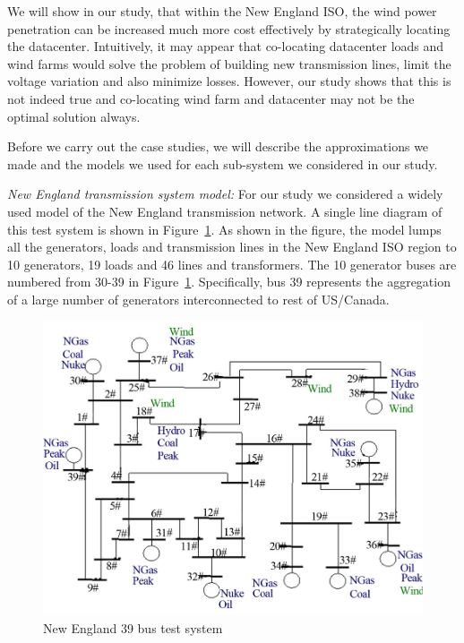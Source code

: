 We will show in our study, that within the New England ISO, the wind power penetration can be increased much more cost effectively by strategically locating the datacenter. Intuitively, it may appear that co-locating datacenter loads and wind farms would solve the problem of building new transmission lines, limit the voltage variation and also minimize losses. However, our study shows that this is not indeed true and co-locating wind farm and datacenter may not be the optimal solution always.

Before we carry out the case studies, we will describe the approximations we made and the models we used for each sub-system we considered in our study.  

{\em New England transmission system model:}
For our study we considered a widely used  \cite{bills1970line} model of the New England transmission network. A single line diagram of this test system is shown in Figure~\ref{fig:newengland}. As shown in the figure, the model lumps all the generators, loads and transmission lines in the New England ISO region to 10 generators, 19 loads and 46 lines and transformers. The 10 generator buses are numbered from 30-39 in Figure~\ref{fig:newengland}. Specifically, bus 39 represents the aggregation of a large number of generators interconnected to rest of US/Canada.

\begin{figure}[ht]
\centering
\includegraphics[width=1\columnwidth]{img/newEngland.jpg}
\caption{New England 39 bus test system}
\label{fig:newengland}
\end{figure}

